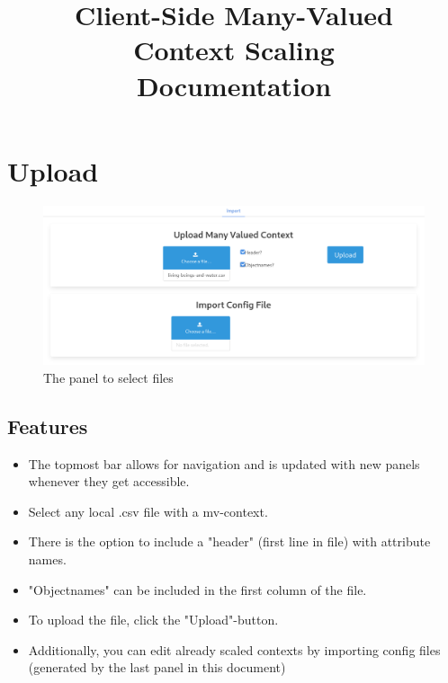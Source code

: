 \documentclass[]{article}
\title{Client-Side Many-Valued \protect\\ Context Scaling \protect\\ Documentation}
\begin{document}
\maketitle

\newpage
\section{Upload}
\begin{figure}[H]
	\includegraphics[width=\linewidth]{images/upload.png}
	\caption{The panel to select files}
	\label{fig:p2}
\end{figure}
\subsection{Features}
\begin{itemize}
    \item The topmost bar allows for navigation and is updated with new panels whenever they get accessible.
	\item Select any local .csv file with a mv-context.
    \item There is the option to include a "header" (first line in file) with attribute names.
    \item "Objectnames" can be included in the first column of the file.
    \item To upload the file, click the "Upload"-button.
    \item Additionally, you can edit already scaled contexts by importing config files (generated by the last panel in this document)
\end{itemize}
\end{document}
